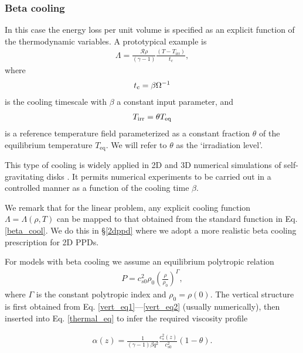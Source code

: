 \subsubsection{Beta cooling}
In this case the energy loss per unit volume is specified 
as an explicit function of the thermodynamic variables. 
A prototypical example is 
\begin{align}\label{beta_cool}
  \Lambda =
  \frac{\mathcal{R}\rho}{(\gamma-1)}\frac{\left(T-T_\mathrm{irr}\right)}{t_c}, 
\end{align}
where 
\begin{align}
  t_\mathrm{c} = \beta\Omega^{-1} 
\end{align}
is the cooling timescale with $\beta$ a constant input parameter, and
\begin{align}
  T_\mathrm{irr} = \theta T_\mathrm{eq}
\end{align}
is a reference temperature field parameterized as a constant fraction
$\theta$ of the equilibrium temperature $T_\mathrm{eq}$. We will refer
to $\theta$ as the `irradiation level'. 

This type of cooling is widely applied in 2D and 3D
numerical simulations of self-gravitating disks \citep{gammie01,
  rice05,baehr15}. It permits numerical experiments to be carried out in a
controlled manner as a function of the cooling time $\beta$. 

We remark that for the linear problem, 
any explicit cooling function $\Lambda=\Lambda(\rho,T)$ can be
mapped to that obtained from the standard function in Eq.
\ref{beta_cool}. We do this in \S\ref{2dppd} where we adopt a more
realistic beta cooling prescription for 2D PPDs.   

For models with beta cooling we assume an equilibrium polytropic relation
\begin{align} 
  P  =
c_{s0}^2\rho_0\left(\frac{\rho}{\rho_0}\right)^\Gamma,
\end{align}
where $\Gamma$ is the constant polytropic index and $\rho_0 =
\rho(0)$. The vertical
structure is first obtained from Eq. \ref{vert_eq1}---\ref{vert_eq2}
(usually numerically), then inserted into
Eq. \ref{thermal_eq} to infer the required viscosity profile 

\begin{align}\label{alpha_beta_relation}
\alpha(z) = \frac{1}{(\gamma-1)\beta
   q^2}\frac{c_s^2(z)}{c_{s0}^2}\left(1 - \theta\right). 
\end{align}


